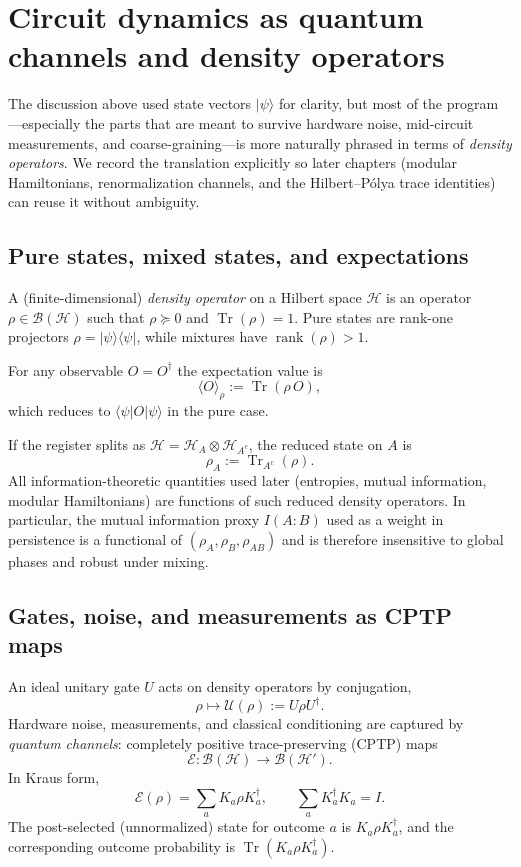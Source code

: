\documentclass[11pt,oneside]{amsbook}
\numberwithin{equation}{section}
\theoremstyle{plain}
\theoremstyle{definition}
\theoremstyle{remark}
\DeclareMathOperator{\rank}{\mathrm{rank}}
\DeclareMathOperator{\Tr}{\mathrm{Tr}}
\newcommand{\ket}[1]{\lvert #1 \rangle}
\newcommand{\bra}[1]{\langle #1 \rvert}
\begin{document}
\section{Circuit dynamics as quantum channels and density operators}
\label{sec:circuit_density_channels}

The discussion above used state vectors $\ket{\psi}$ for clarity, but most of the program---especially the parts that are meant to survive hardware noise, mid-circuit measurements, and coarse-graining---is more naturally phrased in terms of \emph{density operators}.
We record the translation explicitly so later chapters (modular Hamiltonians, renormalization channels, and the Hilbert--Pólya trace identities) can reuse it without ambiguity.

\subsection{Pure states, mixed states, and expectations}
A (finite-dimensional) \emph{density operator} on a Hilbert space $\mathcal{H}$ is an operator $\rho\in\mathcal{B}(\mathcal{H})$ such that $\rho\succeq 0$ and $\Tr(\rho)=1$.
Pure states are rank-one projectors $\rho=\ket{\psi}\bra{\psi}$, while mixtures have $\rank(\rho)>1$.

For any observable $O=O^\dagger$ the expectation value is
\[
\langle O\rangle_\rho := \Tr(\rho\,O),
\]
which reduces to $\bra{\psi}O\ket{\psi}$ in the pure case.

If the register splits as $\mathcal{H}=\mathcal{H}_A\otimes\mathcal{H}_{A^c}$, the reduced state on $A$ is
\[
\rho_A := \Tr_{A^c}(\rho).
\]
All information-theoretic quantities used later (entropies, mutual information, modular Hamiltonians) are functions of such reduced density operators.
In particular, the mutual information proxy $I(A\!:\!B)$ used as a weight in persistence is a functional of $(\rho_A,\rho_B,\rho_{AB})$ and is therefore insensitive to global phases and robust under mixing.

\subsection{Gates, noise, and measurements as CPTP maps}
An ideal unitary gate $U$ acts on density operators by conjugation,
\[
\rho\longmapsto \mathcal{U}(\rho):=U\rho U^\dagger .
\]
Hardware noise, measurements, and classical conditioning are captured by \emph{quantum channels}: completely positive trace-preserving (CPTP) maps
\[
\mathcal{E}:\mathcal{B}(\mathcal{H})\to\mathcal{B}(\mathcal{H}').
\]
In Kraus form,
\begin{equation}
\label{eq:kraus_form}
\mathcal{E}(\rho)=\sum_a K_a\rho K_a^\dagger,\qquad \sum_a K_a^\dagger K_a = I.
\end{equation}
The post-selected (unnormalized) state for outcome $a$ is $K_a\rho K_a^\dagger$, and the corresponding outcome probability is $\Tr(K_a\rho K_a^\dagger)$.
\end{document}
